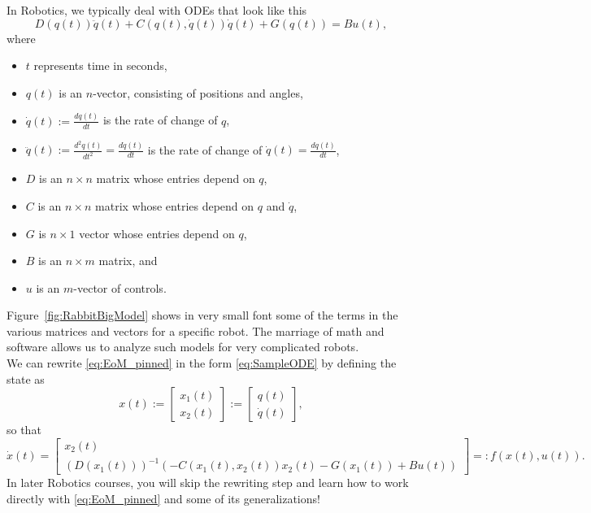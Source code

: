 In Robotics, we typically deal with ODEs that look like this
\begin{equation}
    \label{eq:EoM_pinned}
    D(q(t))\ddot{q}(t) + C(q(t),\dot{q}(t))\dot{q}(t) + G(q(t)) = Bu(t),
\end{equation}
where 
\begin{itemize}
\item $t$ represents time in seconds,
    \item $q(t)$ is an $n$-vector, consisting of positions and angles,
    \item $\dot{q}(t):= \frac{dq(t)}{dt}$ is the rate of change of $q$,
    \item $\ddot{q}(t):= \frac{d^2q(t)}{dt^2} = \frac{d\dot{q}(t)}{dt}$ is the rate of change of $\dot{q}(t) = \frac{dq(t)}{dt}$,
    \item $D$ is an $n \times n$ matrix whose entries depend on $q$,
    \item $C$ is an $n \times n$ matrix whose entries depend on $q$ and $\dot q$,
    \item $G$ is $n \times 1$ vector whose entries depend on $q$,
    \item $B$ is an $n \times m$ matrix, and 
    \item $u$ is an $m$-vector of controls. 
\end{itemize}
Figure~\ref{fig:RabbitBigModel} shows in very small font some of the terms in the various matrices and vectors for a specific robot. The marriage of math and software allows us to analyze such models for very complicated robots. \\

We can rewrite \eqref{eq:EoM_pinned} in the form \eqref{eq:SampleODE} by defining the state as
$$ x(t) := \begin{bmatrix}  x_1(t) \\ x_2(t)\end{bmatrix} := \begin{bmatrix}  q(t) \\ \dot{q}(t)\end{bmatrix},$$
so that
\begin{equation}
    \label{eq:RobotODE}
    \dot{x}(t) = \left[ \begin{array}{cc} x_2(t) \\
    \left( D(x_1(t))\right)^{-1 } \left( -C(x_1(t),x_2(t))x_2(t) - G(x_1(t))  + Bu(t) \right)
   \end{array}  \right]=: f(x(t), u(t)).
\end{equation}
In later Robotics courses, you will skip the rewriting step and learn how to work directly with \eqref{eq:EoM_pinned} and some of its generalizations!

